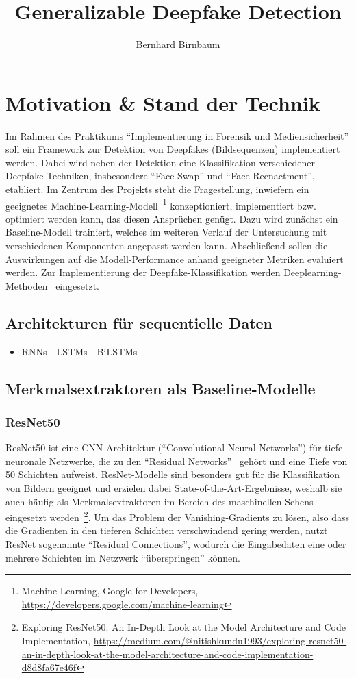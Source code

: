 \documentclass{article}
\title{Generalizable Deepfake Detection}
\author{Bernhard Birnbaum}
\newcommand{\resnet}{ResNet50\xspace}
\begin{document}
    \maketitle

    \section{Motivation \& Stand der Technik}
    Im Rahmen des Praktikums \enquote{Implementierung in Forensik und Mediensicherheit} soll ein Framework zur Detektion von Deepfakes (Bildsequenzen) implementiert werden.
    Dabei wird neben der Detektion eine Klassifikation verschiedener Deepfake-Techniken, insbesondere \enquote{Face-Swap} und \enquote{Face-Reenactment}, etabliert.
    Im Zentrum des Projekts steht die Fragestellung, inwiefern ein geeignetes Machine-Learning-Modell~\footnote{Machine Learning, Google for Developers, \url{https://developers.google.com/machine-learning}} konzeptioniert, implementiert bzw. optimiert werden kann, das diesen Ansprüchen genügt.
    Dazu wird zunächst ein Baseline-Modell trainiert, welches im weiteren Verlauf der Untersuchung mit verschiedenen Komponenten angepasst werden kann.
    Abschließend sollen die Auswirkungen auf die Modell-Performance anhand geeigneter Metriken evaluiert werden.
    Zur Implementierung der Deepfake-Klassifikation werden Deeplearning-Methoden~\cite{deeplearningbook} eingesetzt.
    \subsection{Architekturen für sequentielle Daten}
    \begin{itemize}
        \item RNNs - LSTMs - BiLSTMs %
    \end{itemize}
    \subsection{Merkmalsextraktoren als Baseline-Modelle}
    \subsubsection{\resnet}
    \resnet ist eine CNN-Architektur (\enquote{Convolutional Neural Networks}) für tiefe neuronale Netzwerke, die zu den \enquote{Residual Networks}~\cite{resnet} gehört und eine Tiefe von 50 Schichten aufweist.
    ResNet-Modelle sind besonders gut für die Klassifikation von Bildern geeignet und erzielen dabei State-of-the-Art-Ergebnisse, weshalb sie auch häufig als Merkmalsextraktoren im Bereich des maschinellen Sehens eingesetzt werden~\footnote{Exploring ResNet50: An In-Depth Look at the Model Architecture and Code Implementation, \url{https://medium.com/@nitishkundu1993/exploring-resnet50-an-in-depth-look-at-the-model-architecture-and-code-implementation-d8d8fa67e46f}}.
    Um das Problem der Vanishing-Gradients zu lösen, also dass die Gradienten in den tieferen Schichten verschwindend gering werden, nutzt ResNet sogenannte \enquote{Residual Connections}, wodurch die Eingabedaten eine oder mehrere Schichten im Netzwerk \enquote{überspringen} können.
\end{document}
